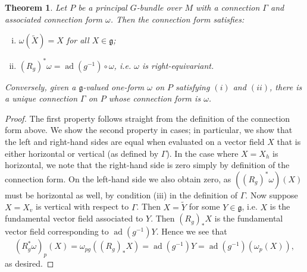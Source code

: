 \documentclass{book}
\newcommand{\fr}{\mathfrak}
\DeclareMathOperator{\ad}{ad}
\theoremstyle{plain}
\newtheorem{thm}{Theorem}
\theoremstyle{definition}
\theoremstyle{remark}
\begin{document}
\begin{thm}
Let $P$ be a principal $G$-bundle over $M$ with a connection $\Gamma$ and associated connection form $\omega$. Then the connection form satisfies:
\begin{enumerate}[(i)]
\item $\omega(\tilde X)=X$ for all $X\in\fr g$;
\item $(R_g)^*\omega=\ad(g^{-1})\circ \omega$, i.e. $\omega$ is right-equivariant.
\end{enumerate}

Conversely, given a $\fr g$-valued one-form $\omega$ on $P$ satisfying $(i)$ and $(ii)$,
there is a unique connection $\Gamma$ on $P$ whose connection form is $\omega$.
\end{thm}
\begin{proof}
The first property follows straight from the definition of the connection form above.
We show the second property in cases; in particular, we show that the left and right-hand sides are equal when evaluated on a vector field $X$ that is either horizontal or vertical (as defined by $\Gamma$).
In the case where $X=X_h$ is horizontal, we note that the right-hand side is zero simply by definition of the connection form.
On the left-hand side we also obtain zero, as $((R_g)^*\omega)(X)$ must be horizontal as well, by condition (iii) in the definition of $\Gamma$.
Now suppose $X=X_v$ is vertical with respect to $\Gamma$. Then $X=\tilde Y$ for some $Y\in\fr g$, i.e. $X$ is the fundamental vector field associated to $Y$.
Then $(R_g)_*X$ is the fundamental vector field corresponding to $\ad(g^{-1})Y$.
 Hence we see that
\[(R_g^*\omega)_p(X)=\omega_{pg}((R_g)_*X)=\ad(g^{-1})Y=\ad(g^{-1})(\omega_p(X)),\]
as desired.


\end{proof}
\end{document}
